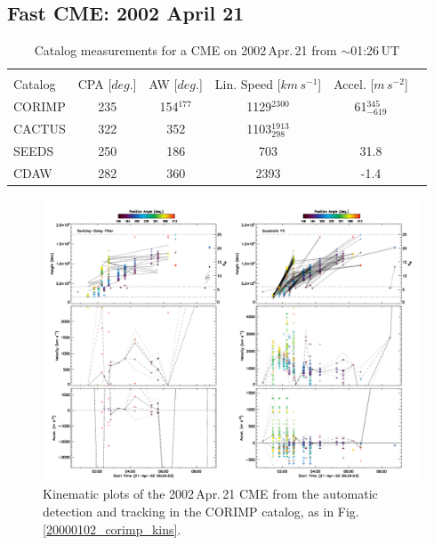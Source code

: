 \documentclass[referee,a4paper,12pt,traditabstract]{swsc}
\begin{document}
\begin{linenumbers}
\subsection{Fast CME: 2002 April 21}
\label{sect_20020421}

\begin{table}[h]
\begin{tabular}{l*{4}{c}r}
\multicolumn{5}{c}{} \\

Catalog              & CPA [$deg.$] & AW [$deg.$] & Lin. Speed [$km\,s^{-1}$] & Accel. [$m\,s^{-2}$]  \\
\hline
CORIMP   & 235 & 154$^{177}$ & 1129$^{2300}$ & 61$_{-619}^{345}$ \\
CACTUS   & 322 & 352 & 1103$_{298}^{1913}$ &  \\
SEEDS    & 250 & 186 & 703 & 31.8 \\
CDAW      & 282 & 360 & 2393 & -1.4 \\
\end{tabular}
\caption{Catalog measurements for a CME on 2002\,Apr.\,21 from $\sim$01:26\,UT}
\label{table_20020421}
\end{table}

\begin{figure}[t]
\centerline{\includegraphics[width=\linewidth]{images/20020421_corimp_kins.pdf}}
\caption{Kinematic plots of the 2002\,Apr.\,21 CME from the automatic detection and tracking in the CORIMP catalog, as in Fig.\,\ref{20000102_corimp_kins}.}
\label{20020421_corimp_kins}
\end{figure}



\end{linenumbers}
\end{document}
